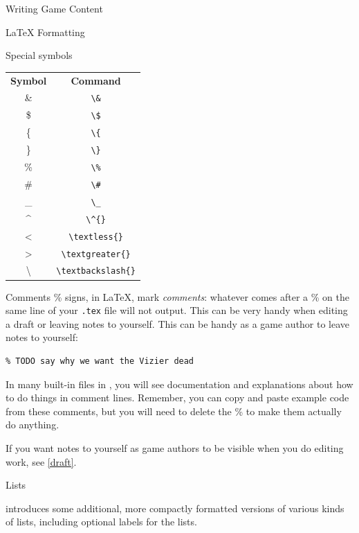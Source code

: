 \documentclass[sheet]{GameTexBase}
\begin{document}
\begin{section}{Writing Game Content}
\begin{subsection}{\LaTeX{} Formatting}
\begin{subsubsection}{Special symbols}
\begin{center}
\begin{tabular}{c c}
 \textbf{Symbol} & \textbf{Command} \\
 \& & \lstinline|\&| \\
 \$ & \lstinline|\$| \\
 \{ & \lstinline|\{| \\
 \} & \lstinline|\}| \\
 \% & \lstinline|\%| \\
 \# & \lstinline|\#| \\
 \_ & \lstinline|\_| \\
 \^{} & \lstinline|\^{}| \\
 \textless & \lstinline|\textless{}| \\
 \textgreater & \lstinline|\textgreater{}| \\
 \textbackslash & \lstinline|\textbackslash{}|
\end{tabular}
\end{center}
\end{subsubsection}
\begin{subsubsection}{Comments}
\% signs, in \LaTeX{}, mark \textit{comments}: whatever comes after a \% on the same line of your \texttt{.tex} file will not output.  This can be very handy when editing a draft or leaving notes to yourself.
This can be handy as a game author to leave notes to yourself:
\begin{verbatim}
% TODO say why we want the Vizier dead
\end{verbatim}
In many built-in files in \gametex{}, you will see documentation and explanations about how to do things in comment lines.  Remember, you can copy and paste example code from these comments, but you will need to delete the \% to make them actually do anything.

If you want notes to yourself as game authors to be visible when you do editing work, see \ref{draft}.
\end{subsubsection}

\begin{subsubsection}{\gametex{} Lists}

\gametex{} introduces some additional, more compactly formatted versions of various kinds of lists, including optional labels for the lists.


\end{subsubsection}
\end{subsection}
\end{section}
\end{document}

